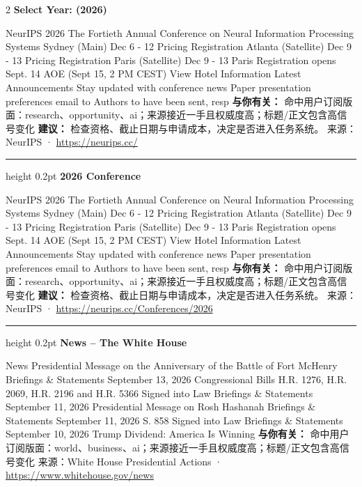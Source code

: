 \documentclass[10.5pt]{ctexart}
\begin{document}
\begin{multicols}{2}
{\large\bfseries Select Year: (2026)}\par
NeurIPS 2026 The Fortieth Annual Conference on Neural Information Processing Systems Sydney (Main) Dec 6 - 12 Pricing Registration Atlanta (Satellite) Dec 9 - 13 Pricing Registration Paris (Satellite) Dec 9 - 13 Paris Registration opens Sept. 14 AOE (Sept 15, 2 PM CEST) View Hotel Information Latest Announcements Stay updated with conference news Paper presentation preferences email to Authors to have been sent, resp
\textbf{与你有关：} 命中用户订阅版面：research、opportunity、ai；来源接近一手且权威度高；标题/正文包含高信号变化
\textbf{建议：} 检查资格、截止日期与申请成本，决定是否进入任务系统。
{\footnotesize\color{ormuted} 来源：NeurIPS · \url{https://neurips.cc/}}
\vspace{2mm}
\hrule height 0.2pt
\vspace{2mm}
{\large\bfseries 2026 Conference}\par
NeurIPS 2026 The Fortieth Annual Conference on Neural Information Processing Systems Sydney (Main) Dec 6 - 12 Pricing Registration Atlanta (Satellite) Dec 9 - 13 Pricing Registration Paris (Satellite) Dec 9 - 13 Paris Registration opens Sept. 14 AOE (Sept 15, 2 PM CEST) View Hotel Information Latest Announcements Stay updated with conference news Paper presentation preferences email to Authors to have been sent, resp
\textbf{与你有关：} 命中用户订阅版面：research、opportunity、ai；来源接近一手且权威度高；标题/正文包含高信号变化
\textbf{建议：} 检查资格、截止日期与申请成本，决定是否进入任务系统。
{\footnotesize\color{ormuted} 来源：NeurIPS · \url{https://neurips.cc/Conferences/2026}}
\vspace{2mm}
\hrule height 0.2pt
\vspace{2mm}
{\large\bfseries News – The White House}\par
News Presidential Message on the Anniversary of the Battle of Fort McHenry Briefings \& Statements September 13, 2026 Congressional Bills H.R. 1276, H.R. 2069, H.R. 2196 and H.R. 5366 Signed into Law Briefings \& Statements September 11, 2026 Presidential Message on Rosh Hashanah Briefings \& Statements September 11, 2026 S. 858 Signed into Law Briefings \& Statements September 10, 2026 Trump Dividend: America Is Winning
\textbf{与你有关：} 命中用户订阅版面：world、business、ai；来源接近一手且权威度高；标题/正文包含高信号变化
{\footnotesize\color{ormuted} 来源：White House Presidential Actions · \url{https://www.whitehouse.gov/news}}
\vspace{2mm}

\end{multicols}
\end{document}
